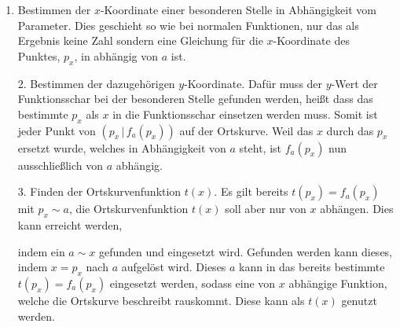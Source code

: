 \documentclass{article}
\begin{document}
\begin{enumerate}
 \item Bestimmen der $x$-Koordinate einer besonderen Stelle in Abhängigkeit vom Parameter. Dies geschieht so wie bei normalen Funktionen, nur das als Ergebnis keine Zahl sondern eine Gleichung für die $x$-Koordinate des Punktes, $p_x$, in abhängig von $a$ ist.
\end{enumerate}   
\begin{minipage}[t]{\dimexpr\textwidth-5cm}
 \begin{enumerate} 
 \item[2.] Bestimmen der dazugehörigen $y$-Koordinate. Dafür muss der $y$-Wert der Funktionsschar bei der besonderen Stelle gefunden werden, heißt dass das bestimmte $p_x$ als $x$ in die Funktionsschar einsetzen werden muss. Somit ist jeder Punkt von $(p_x \,|\, f_a(p_x))$ auf der Ortskurve. Weil das $x$ durch das $p_x$ ersetzt wurde, welches in Abhängigkeit von $a$ steht, ist $f_a(p_x)$ nun ausschließlich von $a$ abhängig.
 \item[3.] Finden der Ortskurvenfunktion $t(x)$. Es gilt bereits $t(p_x) = f_a(p_x)$ mit $p_x \sim a$, die Ortskurvenfunktion $t(x)$ soll aber nur von $x$ abhängen. Dies kann erreicht werden,
 \end{enumerate}
 \end{minipage}
\hfill
\begin{minipage}[t]{5cm}
  \centering
\end{minipage}
\begin{enumerate}
 \vspace{-0.7em} 
 \item[] indem ein $a \sim x$ gefunden und eingesetzt wird. Gefunden werden kann dieses, indem $x = p_x$ nach $a$ aufgelöst wird. Dieses $a$ kann in das bereits bestimmte $t(p_x) = f_a(p_x)$ eingesetzt werden, sodass eine von $x$ abhängige Funktion, welche die Ortskurve beschreibt rauskommt. Diese kann als $t(x)$ genutzt werden.
\end{enumerate}
 
\end{document}

